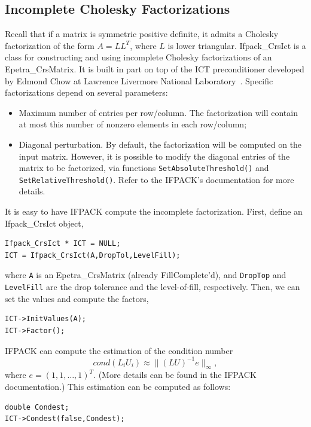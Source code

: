 \subsection{Incomplete Cholesky Factorizations}
\label{sec:ifpack_chol}

Recall that if a matrix is symmetric positive definite, it admits a Cholesky
factorization of the form $A=LL^T$, where $L$ is lower triangular.
Ifpack\_CrsIct is a class for constructing and using incomplete Cholesky
factorizations of an Epetra\_CrsMatrix. It is built in part on top of the ICT
preconditioner developed by Edmond Chow at Lawrence Livermore National
Laboratory~\cite{ChowICT}.  Specific factorizations depend on several parameters:
\begin{itemize}
\item Maximum number of entries per row/column. The factorization
  will contain at most this number of nonzero elements in each
  row/column;
\item Diagonal perturbation.  By default, the factorization will be
  computed on the input matrix. However, it is possible to modify the
  diagonal entries of the matrix to be factorized, via functions
  \verb!SetAbsoluteThreshold()! and \verb!SetRelativeThreshold()!. Refer
  to the IFPACK's documentation for more details.
\end{itemize}

It is easy to have IFPACK compute the incomplete factorization. First, define
an Ifpack\_CrsIct object,
\begin{verbatim}
Ifpack_CrsIct * ICT = NULL;
ICT = Ifpack_CrsIct(A,DropTol,LevelFill);
\end{verbatim}
where \verb!A! is an Epetra\_CrsMatrix (already FillComplete'd), and
\verb!DropTop! and \verb!LevelFill! are the drop tolerance and the
level-of-fill, respectively. Then, we can set the values and compute the
factors,
\begin{verbatim}
ICT->InitValues(A);
ICT->Factor();
\end{verbatim}

IFPACK can compute the estimation of the condition number
\[
cond(L_i U_i) \approx \|(LU)^{-1} e \|_\infty ,
\]
where $e = (1,1,\dots,1)^T$. (More details can be found in the IFPACK
documentation.) This estimation can be computed as follows:
\begin{verbatim}
double Condest;
ICT->Condest(false,Condest);
\end{verbatim}

